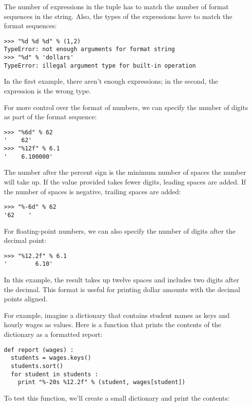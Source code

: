 The number of expressions in the tuple has to match the number
of format sequences in the string.  Also, the types of the
expressions have to match the format sequences:


\beforeverb
\begin{verbatim}
>>> "%d %d %d" % (1,2)
TypeError: not enough arguments for format string
>>> "%d" % 'dollars'
TypeError: illegal argument type for built-in operation
\end{verbatim}
\afterverb
%
In the first example, there aren't enough expressions; in the
second, the expression is the wrong type.

For more control over the format of numbers, we can specify
the number of digits as part of the format sequence:

\beforeverb
\begin{verbatim}
>>> "%6d" % 62
'    62'
>>> "%12f" % 6.1
'    6.100000'
\end{verbatim}
\afterverb
%
The number after the percent sign is the minimum number of spaces
the number will take up.  If the value provided takes fewer digits,
leading spaces are added.  If the number of spaces is negative,
trailing spaces are added:

\beforeverb
\begin{verbatim}
>>> "%-6d" % 62
'62    '
\end{verbatim}
\afterverb
%
For floating-point numbers, we can also
specify the number of digits after the decimal point:

\beforeverb
\begin{verbatim}
>>> "%12.2f" % 6.1
'        6.10'
\end{verbatim}
\afterverb
%
In this example, the result takes up twelve spaces and includes two
digits after the decimal.  This format is useful for printing
dollar amounts with the decimal points aligned.


For example, imagine a dictionary that contains
student names as keys and hourly wages as values.
Here is a function that prints the contents of the dictionary
as a formatted report:

\beforeverb
\begin{verbatim}
def report (wages) :
  students = wages.keys()
  students.sort()
  for student in students :
    print "%-20s %12.2f" % (student, wages[student])
\end{verbatim}
\afterverb
%
To test this function, we'll create a small dictionary
and print the contents:

